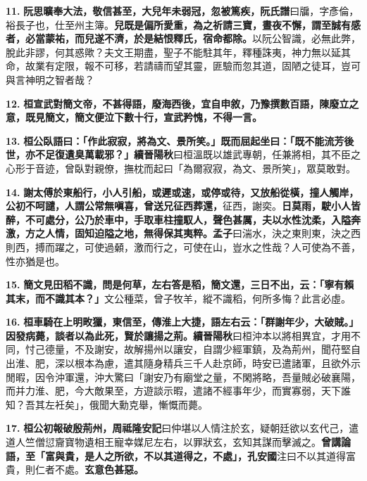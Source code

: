 \textbf{11.} \textbf{阮思曠奉大法，敬信甚至，大兒年未弱冠，忽被篤疾，}{\footnotesize \textbf{阮氏譜}曰牖，字彥倫，裕長子也，仕至州主簿。}\textbf{兒既是偏所愛重，為之祈請三寶，晝夜不懈，謂至誠有感者，必當蒙祐，而兒遂不濟，於是結恨釋氏，宿命都除。}{\footnotesize 以阮公智識，必無此弊，脫此非謬，何其惑歟？夫文王期盡，聖子不能駐其年，釋種誅夷，神力無以延其命，故業有定限，報不可移，若請禱而望其靈，匪驗而忽其道，固陋之徒耳，豈可與言神明之智者哉？}

\textbf{12.} \textbf{桓宣武對簡文帝，不甚得語，廢海西後，宜自申敘，乃豫撰數百語，陳廢立之意，既見簡文，簡文便泣下數十行，宣武矜愧，不得一言。}

\textbf{13.} \textbf{桓公臥語曰：「作此寂寂，將為文、景所笑。」既而屈起坐曰：「既不能流芳後世，亦不足復遺臭萬載邪？」}{\footnotesize \textbf{續晉陽秋}曰桓溫既以雄武專朝，任兼將相，其不臣之心形于音迹，曾臥對親僚，撫枕而起曰「為爾寂寂，為文、景所笑」，眾莫敢對。}

\textbf{14.} \textbf{謝太傅於東船行，小人引船，或遲或速，或停或待，又放船從橫，撞人觸岸，公初不呵譴，人謂公常無嗔喜，曾送兄征西葬還，}{\footnotesize 征西，謝奕。}\textbf{日莫雨，駛小人皆醉，不可處分，公乃於車中，手取車柱撞馭人，聲色甚厲，夫以水性沈柔，入隘奔激，方之人情，固知迫隘之地，無得保其夷粹。}{\footnotesize \textbf{孟子}曰湍水，決之東則東，決之西則西，搏而躍之，可使過顙，激而行之，可使在山，豈水之性哉？人可使為不善，性亦猶是也。}

\textbf{15.} \textbf{簡文見田稻不識，問是何草，左右答是稻，簡文還，三日不出，云：「寧有賴其末，而不識其本？」}{\footnotesize 文公種菜，曾子牧羊，縱不識稻，何所多悔？此言必虛。}

\textbf{16.} \textbf{桓車騎在上明畋獵，東信至，傳淮上大捷，語左右云：「群謝年少，大破賊。」因發病薨，談者以為此死，賢於讓揚之荊。}{\footnotesize \textbf{續晉陽秋}曰桓沖本以將相異宜，才用不同，忖己德量，不及謝安，故解揚州以讓安，自謂少經軍鎮，及為荊州，聞苻堅自出淮、肥，深以根本為慮，遣其隨身精兵三千人赴京師，時安已遣諸軍，且欲外示閒暇，因令沖軍還，沖大驚曰「謝安乃有廟堂之量，不閑將略，吾量賊必破襄陽，而并力淮、肥，今大敵果至，方遊談示暇，遣諸不經事年少，而實寡弱，天下誰知？吾其左衽矣」，俄聞大勳克舉，慚慨而薨。}

\textbf{17.} \textbf{桓公初報破殷荊州，}{\footnotesize \textbf{周祗隆安記}曰仲堪以人情注於玄，疑朝廷欲以玄代己，遣道人竺僧愆齎寶物遺相王寵幸媒尼左右，以罪狀玄，玄知其謀而擊滅之。}\textbf{曾講論語，至「富與貴，是人之所欲，不以其道得之，不處」，}{\footnotesize \textbf{孔安國}注曰不以其道得富貴，則仁者不處。}\textbf{玄意色甚惡。}